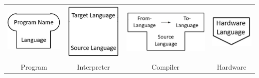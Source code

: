 \begin{center}
    \begin{tabular}{ c c c c }
    \hline
    \includegraphics[scale=0.5]{images/t diagram program.jpg} & \includegraphics[scale=0.5]{images/t diagram interpreter.jpg} & \includegraphics[scale=0.5]{images/t diagram compiler.jpg} & \includegraphics[scale=0.5]{images/t diagram hardware.jpg} \\
    \rowcolor{yellow}
    Program & Interpreter & Compiler & Hardware \\
    \hline
    \end{tabular}
\end{center}

